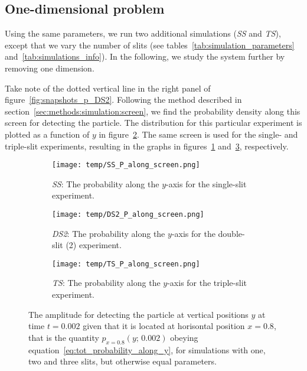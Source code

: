 \subsection{One-dimensional problem}

    Using the same parameters, we run two additional simulations (\textit{SS} and \textit{TS}), except that we vary the number of slits (see tables~\ref{tab:simulation_parameters} and~\ref{tab:simulations_info}). In the following, we study the system further by removing one dimension.

    Take note of the dotted vertical line in the right panel of figure~\ref{fig:snapshots_p_DS2}. Following the method described in section~\ref{sec:methods:simulation:screen}, we find the probability density along this screen for detecting the particle.  The distribution for this particular experiment is plotted as a function of $y$ in figure~\ref{fig:p_along_y_DS2}. The same screen is used for the single- and triple-slit experiments, resulting in the graphs in figures~\ref{fig:p_along_y_SS} and~\ref{fig:p_along_y_TS}, respectively. %

    \begin{figure}
        \centering
        \begin{subfigure}{0.46\textwidth}
            \texttt{[image: temp/SS\_P\_along\_screen.png]}
            \caption{\textit{SS}: The probability along the $y$-axis for the single-slit experiment.}
            \label{fig:p_along_y_SS}
        \end{subfigure}
        \hfill
        \begin{subfigure}{0.46\textwidth}
            \texttt{[image: temp/DS2\_P\_along\_screen.png]}
            \caption{\textit{DS2}: The probability along the $y$-axis for the double-slit (2) experiment.}
            \label{fig:p_along_y_DS2}
        \end{subfigure}
        \hfill
        \begin{subfigure}{0.46\textwidth}
            \texttt{[image: temp/TS\_P\_along\_screen.png]}
            \caption{\textit{TS}: The probability along the $y$-axis for the triple-slit experiment.}
            \label{fig:p_along_y_TS}
        \end{subfigure}
        \caption{The amplitude for detecting the particle at vertical positions $y$ at time $t=0.002$ given that it is located at horisontal position $x=0.8$, that is the quantity $p_{x=0.8}(y;\, 0.002)$ obeying equation~\eqref{eq:tot_probability_along_y}, for simulations with one, two and three slits, but otherwise equal parameters.}
        \label{fig:p_along_y}
    \end{figure}






